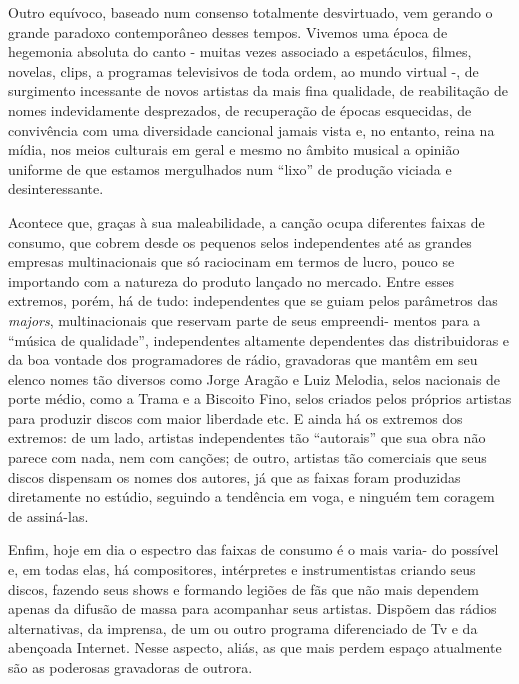 Outro equívoco, baseado num consenso totalmente desvirtuado, vem gerando
o grande paradoxo contemporâneo desses tempos. Vivemos uma época de
hegemonia absoluta do canto - muitas vezes associado a espetáculos,
filmes, novelas, clips, a programas televisivos de toda ordem, ao mundo
virtual -, de surgimento incessante de novos artistas da mais fina
qualidade, de reabilitação de nomes indevidamente desprezados, de
recuperação de épocas esquecidas, de convivência com uma diversidade
cancional jamais vista e, no entanto, reina na mídia, nos meios
culturais em geral e mesmo no âmbito musical a opinião uniforme de que
estamos mergulhados num ``lixo'' de produção viciada e desinteressante.

Acontece que, graças à sua maleabilidade, a canção ocupa diferentes
faixas de consumo, que cobrem desde os pequenos selos independentes até
as grandes empresas multinacionais que só raciocinam em termos de lucro,
pouco se importando com a natureza do produto lançado no mercado. Entre
esses extremos, porém, há de tudo: independentes que se guiam pelos
parâmetros das \emph{majors}, multinacionais que reservam parte de seus
empreendi- mentos para a ``música de qualidade'', independentes
altamente dependentes das distribuidoras e da boa vontade dos
programadores de rádio, gravadoras que mantêm em seu elenco nomes tão
diversos como Jorge Aragão e Luiz Melodia, selos nacionais de porte
médio, como a Trama e a Biscoito Fino, selos criados pelos próprios
artistas para produzir discos com maior liberdade etc. E ainda há os
extremos dos extremos: de um lado, artistas independentes tão
``autorais'' que sua obra não parece com nada, nem com canções; de
outro, artistas tão comerciais que seus discos dispensam os nomes dos
autores, já que as faixas foram produzidas diretamente no estúdio,
seguindo a tendência em voga, e ninguém tem coragem de assiná-las.

Enfim, hoje em dia o espectro das faixas de consumo é o mais varia- do
possível e, em todas elas, há compositores, intérpretes e
instrumentistas criando seus discos, fazendo seus shows e formando
legiões de fãs que não mais dependem apenas da difusão de massa para
acompanhar seus artistas. Dispõem das rádios alternativas, da imprensa,
de um ou outro programa diferenciado de Tv e da abençoada Internet.
Nesse aspecto, aliás, as que mais perdem espaço atualmente são as
poderosas gravadoras de outrora.

